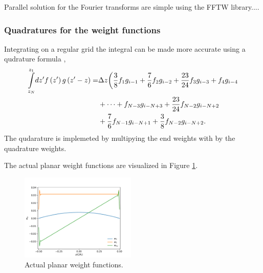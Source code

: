 \documentclass[12pt, letterpaper]{article}
\newcommand*{\lb}{\ensuremath{\left(}}
\newcommand*{\rb}{\ensuremath{\right)}}
\begin{document}
Parallel solution for the Fourier transforms are simple using the FFTW library....

\subsubsection{Quadratures for the weight functions}
Integrating on a regular grid the integral can be made more accurate using a qudrature formula ,
\begin{align}
  \underset{z_N}{\overset{z_1}{\int}} dz^\prime f \lb z^\prime \rb g \lb z^\prime - z \rb =& \Delta z \biggl( \frac{3}{8} f_1 g_{i-1} + \frac{7}{6} f_2 g_{i-2} + \frac{23}{24} f_3 g_{i-3} + f_4 g_{i-4} \nonumber \\&+ \dots  + f_{N-3} g_{i-N+3} + \frac{23}{24} f_{N-2} g_{i-N+2} \nonumber \\&+ \frac{7}{6} f_{N-1} g_{i-N+1} + \frac{3}{8} f_{N-2} g_{i-N+2}.
\end{align}
The qudarature is implemeted by multipying the end weights with by the
quadrature weights.

The actual planar weight functions are visualized in Figure
\ref{fig:actual_planar_weights}.
\begin{figure}[tbp]
  \centering
  \includegraphics[width=0.49\textwidth]{gfx/actual_planar_weights}
  \caption{Actual planar weight functions.}
  \label{fig:actual_planar_weights}
\end{figure}
\end{document}
